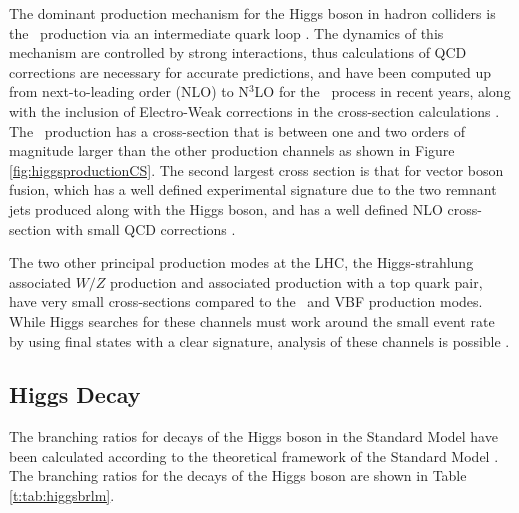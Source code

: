 		The dominant production mechanism for the Higgs boson in hadron colliders is the \ggF\, production via an intermediate quark loop \cite{higgsproduction}. The dynamics of this mechanism are controlled by strong interactions, thus calculations of QCD corrections are necessary for accurate predictions, and have been computed up from next-to-leading order (NLO) to N$^3$LO for the \ggF\ process in recent years, along with the inclusion of Electro-Weak corrections in the cross-section calculations \cite{LHCHiggsCS}. The \ggf\ production has a cross-section that is between one and two orders of magnitude larger than the other production channels as shown in Figure \ref{fig:higgsproductionCS}. The second largest cross section is that for vector boson fusion, which has a well defined experimental signature due to the two remnant jets produced along with the Higgs boson, and has a well defined NLO cross-section with small QCD corrections \cite{higgssearch}.

		The two other principal production modes at the LHC, the Higgs-strahlung associated $W/Z$ production and associated production with a top quark pair, have very small cross-sections compared to the \ggF\ and VBF production modes. While Higgs searches for these channels must work around the small event rate by using final states with a clear signature, analysis of these channels is possible \cite{vhpaper, tthpaper}.

	\subsection{Higgs Decay}

		The branching ratios for decays of the Higgs boson in the Standard Model have been calculated according to the theoretical framework of the Standard Model \cite{HDECAY}. The branching ratios for the decays of the Higgs boson are shown in Table \ref{t:tab:higgsbrlm}.

